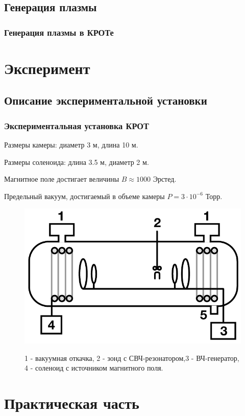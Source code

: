 \documentclass[10pt,pdf,hyperref={unicode}, dvipsnames]{beamer}
\begin{document}
\begin{frame}
\begin{frame}[t]
\end{frame}
\subsection{Генерация плазмы}
\begin{frame}
	\frametitle{Генерация плазмы в КРОТе}
\end{frame}
\section{Эксперимент}
\subsection{Описание экспериментальной установки}
\begin{frame}
	\frametitle{Экспериментальная установка КРОТ}
	Размеры камеры: диаметр 3 м, длина 10 м.

	Размеры соленоида: длина 3.5 м, диаметр 2 м. 
	
	Магнитное поле достигает величины $B\approx 1000$ Эрстед. 
	
	Предельный вакуум, достигаемый в объеме камеры $P =3\cdot10^{-6}$ Торр. 
	\begin{figure}[tb]
		\vspace{0pt}
		\centering
		\includegraphics[width=0.6\linewidth]{fig/krot}
		\label{fig:krot}
		\caption{1 - вакуумная откачка, 2 - зонд с СВЧ-резонатором,3 - ВЧ-генератор, 4 - соленоид с источником магнитного поля.}
	\end{figure}
\end{frame}
\section{Практическая часть} %

\end{frame}
\end{document}
